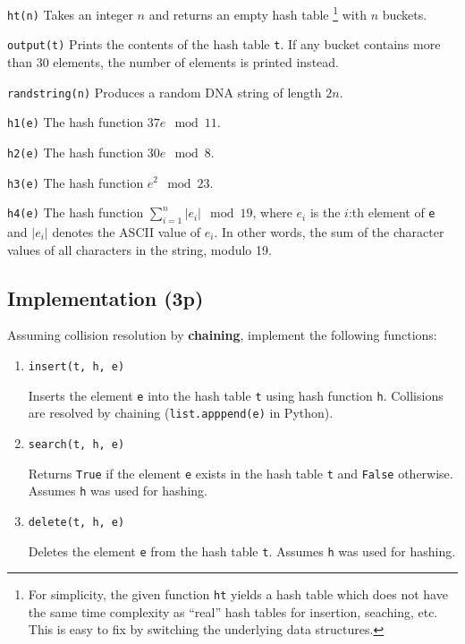 \documentclass{article}
\begin{document}
\begin{description}

\item \lstinline{ht(n)}
Takes an integer $n$ and returns an empty hash table \footnote{For simplicity, the given function {\tt ht} yields a hash table which does not have the same time complexity  as ``real'' hash tables for insertion, seaching, etc. This is easy to fix by switching the
underlying data structures.} 
with $n$ buckets. 

\item \lstinline{output(t)} 
Prints the contents of the hash table \lstinline{t}. If any bucket contains more than 30 elements, the number of elements is printed instead.

\item \lstinline{randstring(n)}
Produces a random DNA string of length $2n$. 

\item \lstinline{h1(e)} 
The hash function $37e \mod 11$.

\item \lstinline{h2(e)} 
The hash function $30e \mod 8$.

\item \lstinline{h3(e)}
The hash function $e^2 \mod 23$.

\item \lstinline{h4(e)}
The hash function $\sum_{i=1}^n |e_i| \mod 19$, where $e_i$ is the $i$:th element of \lstinline{e} and $|e_i|$ denotes the ASCII value of $e_i$.
In other words, the sum of the character values of all characters in the string, modulo 19.

\end{description}

\subsection{Implementation {\bf (3p)}}

Assuming collision resolution by {\bf chaining}, implement the following functions:

\begin{enumerate}
\item \lstinline{insert(t, h, e)}

Inserts the element \lstinline{e} into the hash table \lstinline{t} using hash function \lstinline{h}. Collisions are resolved by chaining (\lstinline{list.apppend(e)} in Python).

\item \lstinline{search(t, h, e)}

Returns \lstinline{True} if the element \lstinline{e} exists in the hash table \lstinline{t} and \lstinline{False} otherwise. Assumes \lstinline{h} was used for hashing.

\item \lstinline{delete(t, h, e)}

Deletes the element \lstinline{e} from the hash table \lstinline{t}. Assumes \lstinline{h} was used for hashing.

\end{enumerate}
\end{document}
